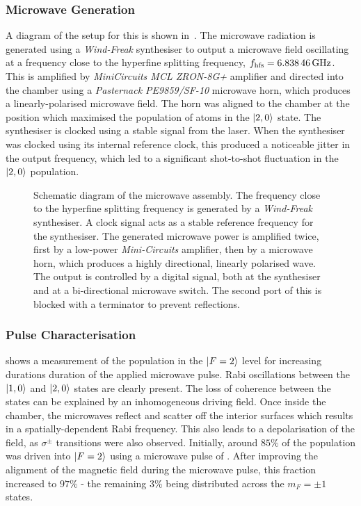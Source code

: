\subsubsection{Microwave Generation}
A diagram of the setup for this is shown
in~. The microwave radiation is
generated using a \textit{Wind-Freak} synthesiser to output a
microwave field oscillating at a frequency close to the hyperfine
splitting frequency, \(f_\text{hfs} =
\sivalue{6.83846}{\giga\hertz}\). This is amplified by
\textit{MiniCircuits MCL ZRON-8G+} amplifier and directed into the
chamber using a \textit{Pasternack PE9859/SF-10} microwave horn, which
produces a linearly-polarised microwave field. The horn was aligned to
the chamber at the position which maximised the population of atoms in
the \(\ket{2,0}\) state. The synthesiser is clocked using a stable
 signal from the \Muquans{} laser. When the
synthesiser was clocked using its internal 
reference clock, this produced a noticeable jitter in the output
frequency, which led to a significant shot-to-shot fluctuation in the
\(\ket{2,0}\) population.
\begin{figure}[!htbp]
    \centering
    \resizebox{0.5\textwidth}{!}{}
    \caption[Setup for Microwaves]{Schematic diagram of the microwave assembly. The frequency close to the hyperfine splitting frequency is generated by a \textit{Wind-Freak} synthesiser. A  clock signal acts as a stable reference frequency for the synthesiser. The generated microwave power is amplified twice, first by a low-power \textit{Mini-Circuits} amplifier, then by a microwave horn, which produces a highly directional, linearly polarised wave. The output is controlled by a digital signal, both at the synthesiser and at a bi-directional microwave switch. The second port of this is blocked with a  terminator to prevent reflections. }
    \label{fig:microwave_setup}
\end{figure}
\subsubsection{Pulse Characterisation}
 shows a measurement of the population in the
\(\ket{F=2}\) level for increasing durations duration of the applied
microwave pulse. Rabi oscillations between the \(\ket{1,0}\) and
\(\ket{2,0}\) states are clearly present. The loss of coherence
between the states can be explained by an inhomogeneous driving field.
Once inside the chamber, the microwaves reflect and scatter off the
interior surfaces which results in a spatially-dependent Rabi
frequency. This also leads to a depolarisation of the field, as
\(\sigma^{\pm}\) transitions were also observed. Initially, around
\(85\%\) of the population was driven into \(\ket{F=2}\) using a
microwave pulse of . After improving the
alignment of the magnetic field during the microwave pulse, this
fraction increased to \(97\%\) - the remaining 3\% being distributed
across the \(m_F = \pm 1\) states.

